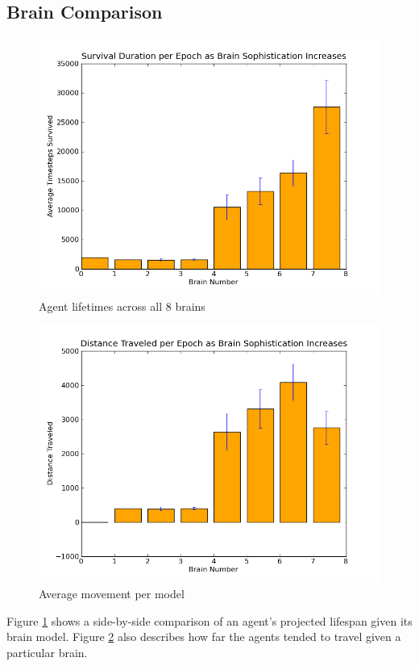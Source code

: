 \subsection{Brain Comparison}
\begin{figure}
\begin{center}
  \includegraphics[scale=.65]{plots/survive.png}
  \caption{Agent lifetimes across all 8 brains}
  \label{fig:survive}
\end{center}
\end{figure}

\begin{figure}
\begin{center}
  \includegraphics[scale=.65]{plots/move.png}
  \caption{Average movement per model}
  \label{fig:move}
\end{center}
\end{figure}

Figure \ref{fig:survive} shows a side-by-side comparison of an agent's 
projected lifespan given its brain model. Figure \ref{fig:move} also 
describes how far the agents tended to travel given a particular brain.
